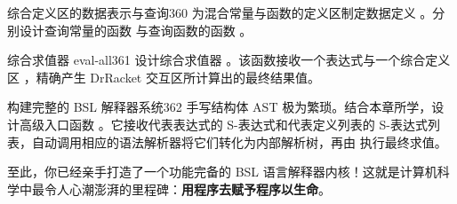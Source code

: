 \begin{exercise}{综合定义区的数据表示与查询}{360}
为混合常量与函数的定义区制定数据定义 。分别设计查询常量的函数  与查询函数的函数 。
\end{exercise}

\begin{exercise}{综合求值器 eval-all}{361}
设计综合求值器 。该函数接收一个表达式与一个综合定义区 ，精确产生 DrRacket 交互区所计算出的最终结果值。
\end{exercise}

\begin{exercise}{构建完整的 BSL 解释器系统}{362}
手写结构体 AST 极为繁琐。结合本章所学，设计高级入口函数 。它接收代表表达式的 S-表达式和代表定义列表的 S-表达式列表，自动调用相应的语法解析器将它们转化为内部解析树，再由  执行最终求值。
\end{exercise}

至此，你已经亲手打造了一个功能完备的 BSL 语言解释器内核！这就是计算机科学中最令人心潮澎湃的里程碑：\textbf{用程序去赋予程序以生命}。

